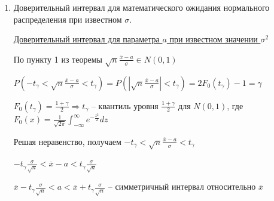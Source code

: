 \begin{enumerate}
    \Def \hyperlink{interval_estimation}{Интервал} $(\theta^-_\gamma; \theta^+_\gamma)$ называется доверительным интервалом параметра $\theta$
    надежности $\gamma$, если вероятность $P(\theta^-_\gamma < \theta < \theta^+_\gamma) = \gamma$
    
    \Nota Если имеем дискретную случайную величину, то $P(\theta^-_\gamma < \theta < \theta^+_\gamma) \geq \gamma$
    
    \Notas Так как параметр $\theta$ -- константа, то бессмысленно говорить о его попадании в интервал. Правильно: 
    доверительный интервал накрывает параметр $\theta$ с вероятностью $\gamma$
    
     $\alpha = 1 - \gamma$ называется уровнем значимости доверительного интервала
    
     Обычно пытаются строить симметричный доверительный интервал относительно несмещенной оценки $\theta^*$
    
     Возникает вопрос, какой уровень $\gamma$ выбрать для исследования.
    Стандартные уровни надежности $\gamma$: $0.9, \ 0.95, \ 0.99, \ 0.999$. Самый мейнстримный -- $0.95$. 
    В малых выборках используют $0.9$

    \item Доверительный интервал для математического ожидания нормального распределения при известном $\sigma$.

    \hyperlink{confidence_interval_for_a_known_sigma}{Доверительный интервал для параметра $a$ при известном значении $\sigma^2$}

    По пункту 1 из теоремы $\sqrt{n} \frac{\overline{x} - a}{\sigma} \in N(0, 1)$ 

    $P\left(-t_\gamma < \sqrt{n} \frac{\overline{x} - a}{\sigma} < t_\gamma\right) = 
    P\left(\left|\sqrt{n} \frac{\overline{x} - a}{\sigma}\right| < t_\gamma\right) = 2F_0 (t_\gamma) - 1 = \gamma$

    $F_0(t_\gamma) = \frac{1 + \gamma}{2} \Longrightarrow t_\gamma$ -- квантиль уровня 
    $\frac{1 + \gamma}{2}$ для $N(0, 1)$, где
    $F_0(x) = \frac{1}{\sqrt{2\pi}} \int_{-\infty}^{\infty} e^{-\frac{z^2}{2}} dz$

    Решая неравенство, получаем $-t_\gamma < \sqrt{n} \frac{\overline{x} - a}{\sigma} < t_\gamma$

    $-t_\gamma \frac{\sigma}{\sqrt{n}} < \overline{x} - a < t_\gamma \frac{\sigma}{\sqrt{n}}$

    $\overline{x} - t_\gamma \frac{\sigma}{\sqrt{n}} < a < \overline{x} + t_\gamma \frac{\sigma}{\sqrt{n}}$ -- 
    симметричный интервал относительно $\overline{x}$


\end{enumerate}

